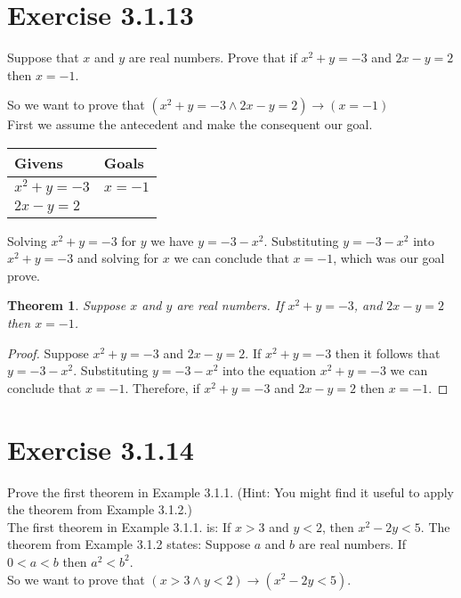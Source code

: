\documentclass{article}
\newcommand{\n}{ \noindent }
\newtheorem*{theorem}{Theorem}  %
\begin{document}
\section*{Exercise 3.1.13}
Suppose that $x$ and $y$ are real numbers. Prove that if $x^2 + y = -3$ and $2x - y = 2$ then $x = -1$.

\n So we want to prove that 
$(x^2 + y = -3 \land 2x - y = 2) \rightarrow (x = -1)$ \\

\n First we assume the antecedent and make the consequent our goal.

\begin{table}[h]
\begin{tabular}{ll}
\hline
Givens & Goals   \\ \hline
$x^2 + y = -3$ & $x = -1$   \\
$ 2x - y = 2$ &\\ \hline
\end{tabular}
\end{table}

\n Solving $x^2 + y = -3$ for $y$ we have $y = -3-x^2$. Substituting $y = -3-x^2$ into $x^2 + y = -3$ and solving for $x$ we can conclude that $x = -1$, which was our goal prove.

\begin{theorem} Suppose $x$ and $y$ are real numbers. If $x^2 + y = -3$, and $2x - y = 2$ then $x = -1$.
\end{theorem}
\begin{proof}
Suppose $x^2 + y = -3$ and $2x - y = 2$. If $x^2 + y = -3$ then it follows that $y = -3-x^2$. Substituting $y = -3-x^2$ into the equation $x^2 + y = -3$ we can conclude that $x = -1$. Therefore, if $x^2 + y = -3$ and $2x - y = 2$ then $x = -1$.
\end{proof}

\section*{Exercise 3.1.14}
Prove the first theorem in Example 3.1.1. (Hint: You might find it useful to apply the theorem from Example 3.1.2.) \\

\n The first theorem in Example 3.1.1. is: If $x>3$ and $y<2$, then $x^2 - 2y < 5$. The theorem from Example 3.1.2 states: Suppose $a$ and $b$ are real numbers. If $0<a<b$ then $a^2 < b^2$.\\

\n So we want to prove that
$(x>3 \land y<2) \rightarrow (x^2 - 2y < 5)$. \\
\end{document}
